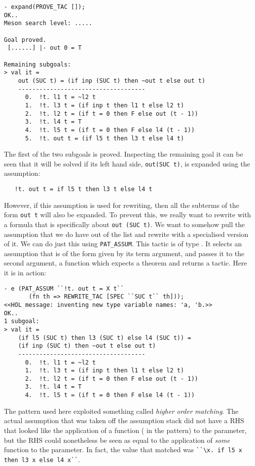 \begin{session}
\begin{verbatim}
- expand(PROVE_TAC []);
OK..
Meson search level: .....

Goal proved.
 [......] |- out 0 = T

Remaining subgoals:
> val it =
    out (SUC t) = (if inp (SUC t) then ~out t else out t)
    ------------------------------------
      0.  !t. l1 t = ~l2 t
      1.  !t. l3 t = (if inp t then l1 t else l2 t)
      2.  !t. l2 t = (if t = 0 then F else out (t - 1))
      3.  !t. l4 t = T
      4.  !t. l5 t = (if t = 0 then F else l4 (t - 1))
      5.  !t. out t = (if l5 t then l3 t else l4 t)
\end{verbatim}
\end{session}
The first of the two subgoals is proved.  Inspecting the remaining
goal it can be seen that it will be solved if its left hand side,
{\small\verb|out(SUC t)|}, is expanded using the assumption:

{\small\begin{verbatim}
   !t. out t = if l5 t then l3 t else l4 t
\end{verbatim}}

    However, if this assumption is used for rewriting, then all the
    subterms of the form {\small\verb|out t|} will also be expanded.
    To prevent this, we really want to rewrite with a formula that is
    specifically about {\small\verb|out (SUC t)|}.  We want to somehow
    pull the assumption that we do have out of the list and rewrite
    with a specialised version of it.  We can do just this using
    {\small\verb|PAT_ASSUM|}.  This tactic is of type .  It selects an assumption that is of the form given
    by its term argument, and passes it to the second argument, a
    function which expects a theorem and returns a tactic.  Here it is
    in action:

\begin{session}
\begin{verbatim}
- e (PAT_ASSUM ``!t. out t = X t``
       (fn th => REWRITE_TAC [SPEC ``SUC t`` th]));
<<HOL message: inventing new type variable names: 'a, 'b.>>
OK..
1 subgoal:
> val it =
    (if l5 (SUC t) then l3 (SUC t) else l4 (SUC t)) =
    (if inp (SUC t) then ~out t else out t)
    ------------------------------------
      0.  !t. l1 t = ~l2 t
      1.  !t. l3 t = (if inp t then l1 t else l2 t)
      2.  !t. l2 t = (if t = 0 then F else out (t - 1))
      3.  !t. l4 t = T
      4.  !t. l5 t = (if t = 0 then F else l4 (t - 1))
\end{verbatim}
\end{session}
The pattern used here exploited something called \emph{higher order
  matching}. The actual assumption that was taken off the assumption
stack did not have a RHS that looked like the application of a
function ( in the pattern) to the  parameter, but the RHS
could nonetheless be seen as equal to the application of \emph{some}
function to the  parameter.  In fact, the value that matched
 was {\small\verb|``\x. if l5 x then l3 x else l4 x``|}.

